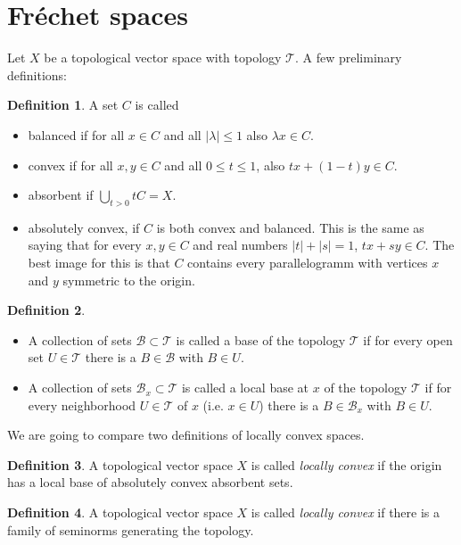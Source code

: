\documentclass{scrartcl}
\theoremstyle{definition}
\newtheorem{definition}{Definition}
\theoremstyle{remark}
\newcommand{\Frechet}{Fr\'echet }
\newcommand{\T}{\mathcal T}
\begin{document}
\section{\Frechet spaces}
Let $X$ be a topological vector space with topology $\T$. A few preliminary definitions:
\begin{definition}
A set $C$ is called
\begin{itemize}
\item balanced if for all $x\in C$ and all $|\lambda| \leq 1$ also $\lambda x \in C$.
\item convex if for all $x, y\in C$ and all $0\leq t \leq 1$, also $tx+(1-t)y\in C$.
\item absorbent if $\bigcup_{t>0} tC = X$.
\item absolutely convex, if $C$ is both convex and balanced. This is the same as saying that for every $x,y\in C$ and real numbers $|t|+|s|=1$, $tx+sy \in C$. The best image for this is that $C$ contains every parallelogramm with vertices $x$ and $y$ symmetric to the origin.
\end{itemize} 
\end{definition}
\begin{definition}
\begin{itemize}
\item A collection of sets $\mathcal B \subset \T$ is called a base of the topology $\T$ if for every open set $U\in\T$ there is a $B\in \mathcal B$ with $B\in U$.
\item A collection of sets $\mathcal B_x \subset \T$ is called a local base at $x$ of the topology $\T$ if for every neighborhood $U\in\T$ of $x$ (i.e. $x\in U$) there is a $B\in \mathcal{ B}_x$ with $B\in U$.
\end{itemize}
\end{definition}

We are going to compare two definitions of locally convex spaces.

\begin{minipage}[t]{0.45\textwidth}
\begin{definition}\label{def:l1}
A topological vector space $X$ is called \textit{locally convex} if the origin has a local base of absolutely convex absorbent sets.
\end{definition}
\end{minipage}
\hfill
\begin{minipage}[t]{0.45\textwidth}
\begin{definition}\label{def:l2}
A topological vector space $X$ is called \textit{locally convex} if there is a family of seminorms generating the topology.
\end{definition}
\end{minipage}
\end{document}
